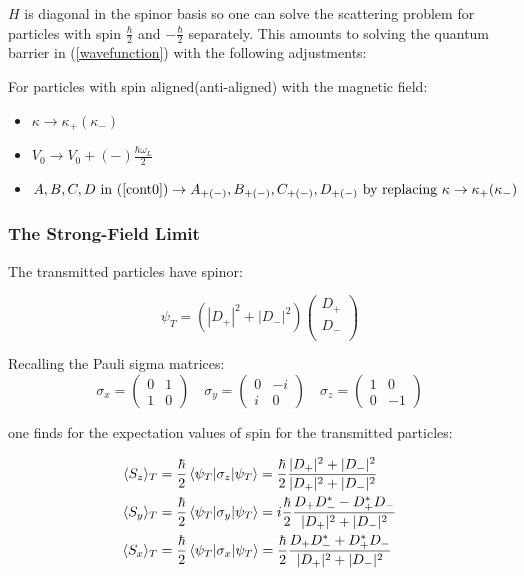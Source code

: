 \documentclass{article}
\begin{document}
\noindent $H$ is diagonal in the spinor basis so one can solve the scattering problem for particles with spin $\frac{\hbar}{2}$ and $-\frac{\hbar}{2}$ separately. This amounts to solving the quantum barrier in (\ref{wavefunction}) with the following adjustments:

For particles with spin aligned(anti-aligned) with the magnetic field:

\begin{itemize}
	\item $\kappa \to \kappa_{+}(\kappa_{-})$
	\item $V_0 \to V_0+(-)\frac{\hbar \omega_L}{2}$
	\item $A,B,C,D \text{ in } (\ref{cont0}) \to A_{+(-)},B_{+(-)},C_{+(-)},D_{+(-)} \text{ by replacing } \kappa \to \kappa_{+}(\kappa_{-})$
\end{itemize}

\subsubsection{The Strong-Field Limit}
The transmitted particles have spinor:

\begin{equation}
	\psi_T = (|D_{+}|^2+|D_{-}|^2)
	\begin{pmatrix}
		D_{+}\\
		D_{-}\\
	\end{pmatrix}
\end{equation}

\noindent Recalling the Pauli sigma matrices:
\begin{equation}
	\sigma_x = 
	\begin{pmatrix}
		0&1\\
		1&0
	\end{pmatrix} \quad
	\sigma_y = 
	\begin{pmatrix}
		0&-i\\
		i&0
	\end{pmatrix} \quad
	\sigma_z =
	\begin{pmatrix}
		1&0\\
		0&-1
	\end{pmatrix}
\end{equation}

\noindent one finds for the expectation values of spin for the transmitted particles:

\begin{align}
	\langle S_z \rangle_T &= \frac{\hbar}{2}\braket{\psi_T|\sigma_z|\psi_T}=\frac{\hbar}{2}\frac{|D_+|^2+|D_-|^2}{|D_+|^2+|D_-|^2} \\
	\langle S_y \rangle_T &= \frac{\hbar}{2}\braket{\psi_T|\sigma_y|\psi_T}=i\frac{\hbar}{2}\frac{D_+D_-^*-D_+^*D_-}{|D_+|^2+|D_-|^2} \\
	\langle S_x \rangle_T &= \frac{\hbar}{2}\braket{\psi_T|\sigma_x|\psi_T}=\frac{\hbar}{2}\frac{D_+D_-^*+D_+^*D_-}{|D_+|^2+|D_-|^2}
\end{align}
\end{document}
